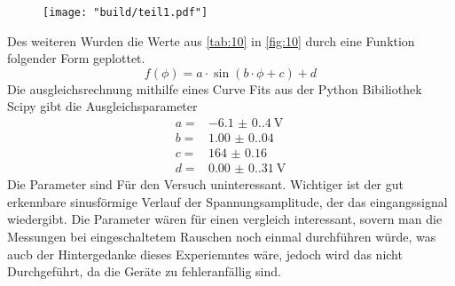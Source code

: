 \begin{figure}[H]
    \caption{}
    \label{fig:10}
    \centering
    \texttt{[image: "build/teil1.pdf"]}
\end{figure}
Des weiteren Wurden die Werte aus \autoref{tab:10} in \autoref{fig:10} durch eine Funktion 
folgender Form geplottet.
\begin{equation}
    f\left(\phi\right) = a \cdot \sin \left(b \cdot \phi + c\right) + d
\end{equation}
Die ausgleichsrechnung mithilfe eines Curve Fits aus der Python Bibiliothek Scipy gibt 
die Ausgleichsparameter 
\begin{align*}
    a = & \qty{-6.1(0.4)}{\volt}   \\
    b = & \qty{1.00(0.04)}{}     \\
    c = & \qty{164(0.16)}{}    \\
    d = & \qty{0.00(0.31)}{\volt}      
\end{align*}
Die Parameter sind Für den Versuch uninteressant. Wichtiger ist der gut erkennbare 
sinusförmige Verlauf der Spannungsamplitude, der das eingangssignal wiedergibt. Die Parameter 
wären für einen vergleich interessant, sovern man die Messungen bei eingeschaltetem Rauschen 
noch einmal durchführen würde, was aucb der Hintergedanke dieses Experiemntes wäre, jedoch wird 
das nicht Durchgeführt, da die Geräte zu fehleranfällig sind.




